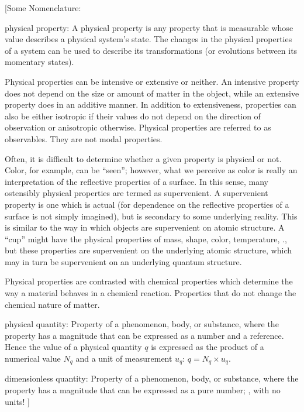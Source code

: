 [Some Nomenclature:

physical property: A physical property is any property that is measurable whose value describes a physical system's state. The changes in the physical properties of a system can be used to describe its transformations (or evolutions between its momentary states).

Physical properties can be intensive or extensive or neither. An intensive property does not depend on the size or amount of matter in the object, while an extensive property does in an additive manner. In addition to extensiveness, properties can also be either isotropic if their values do not depend on the direction of observation or anisotropic otherwise. Physical properties are referred to as observables. They are not modal properties.

Often, it is difficult to determine whether a given property is physical or not. Color, for example, can be ``seen''; however, what we perceive as color is really an interpretation of the reflective properties of a surface. In this sense, many ostensibly physical properties are termed as supervenient. A supervenient property is one which is actual (for dependence on the reflective properties of a surface is not simply imagined), but is secondary to some underlying reality. This is similar to the way in which objects are supervenient on atomic structure. A ``cup'' might have the physical properties of mass, shape, color, temperature, \etc., but these properties are supervenient on the underlying atomic structure, which may in turn be supervenient on an underlying quantum structure.

Physical properties are contrasted with chemical properties which determine the way a material behaves in a chemical reaction. Properties that do not change the chemical nature of matter.

physical quantity: Property of a phenomenon, body, or substance, where the property has a magnitude that can be expressed as a number and a reference. Hence the value of a physical quantity $q$ is expressed as the product of a numerical value $N_q$ and a unit of measurement $u_q$: $q = N_q\times u_q$.

dimensionless quantity: Property of a phenomenon, body, or substance, where the property has a magnitude that can be expressed as a pure number; \ie, with no units!
]

